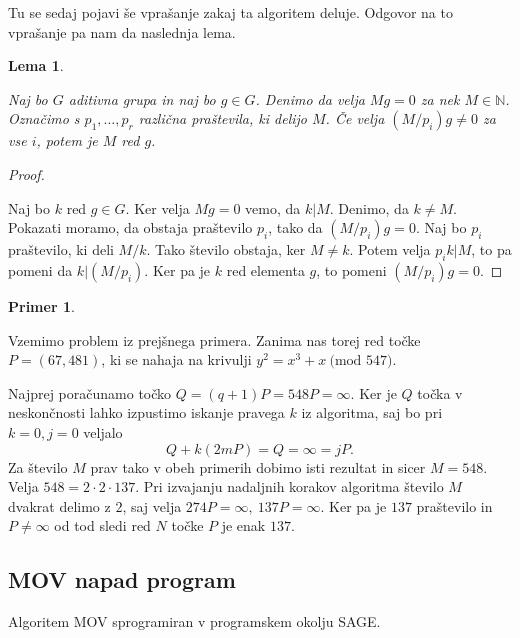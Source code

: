 \documentclass[12pt,a4paper,twoside]{article}
\theoremstyle{definition} %
\newtheorem{primer}[definicija]{Primer}
\theoremstyle{plain} %
\newtheorem{lema}[definicija]{Lema}
\numberwithin{equation}{section}  %
\newcommand{\N}{\mathbb N}
\newcommand{\MOD}[1]{\ \text{(mod }{#1}\text{)}}
\begin{document}
Tu se sedaj pojavi še vprašanje zakaj ta algoritem deluje. Odgovor na to vprašanje pa nam da naslednja lema.

\begin{lema}~

Naj bo $G$ aditivna grupa in naj bo $g\in G$. Denimo da velja $Mg = 0$ za nek $M \in \N$. Označimo s $p_1,\ldots,p_r$ različna praštevila, ki delijo $M$. Če velja $(M/p_i)g \neq  0$ za vse $i$, potem je $M$ red $g$.

\end{lema}

\begin{proof}~

Naj bo $k$ red $g\in G$. Ker velja $Mg = 0$ vemo, da $k|M$. Denimo, da $k \neq M$. Pokazati moramo, da obstaja praštevilo $p_i$, tako da $(M/p_i)g = 0$. Naj bo $p_i$ praštevilo, ki deli $M/k$. Tako število obstaja, ker $M \neq k$. Potem velja $p_ik|M$, to pa pomeni da $k|(M/p_i)$. Ker pa je $k$ red elementa $g$, to pomeni $(M/p_i)g = 0$.

\end{proof}


\begin{primer}~

Vzemimo problem iz prejšnega primera. Zanima nas torej red točke \newline $P=(67,481)$, ki se nahaja na krivulji $y^2 = x^3+x \MOD{547}$.

Najprej poračunamo točko $Q = (q+1)P = 548P = \infty$. Ker je $Q$ točka v neskončnosti lahko izpustimo iskanje pravega $k$ iz algoritma, saj bo pri $k=0,j=0$ veljalo
$$Q+k(2mP) = Q =  \infty = jP.$$
Za število $M$ prav tako v obeh primerih dobimo isti rezultat in sicer $M = 548$. Velja $548=2\cdot 2\cdot 137$. Pri izvajanju nadaljnih korakov algoritma število $M$ dvakrat delimo z $2$, saj velja $274P = \infty, \ 137P = \infty$. Ker pa je $137$ praštevilo in $P \neq \infty$ od tod sledi red $N$ točke $P$ je enak $137$.

\end{primer}


\subsection{MOV napad program}

Algoritem MOV sprogramiran v programskem okolju SAGE.



\newpage
\end{document}
